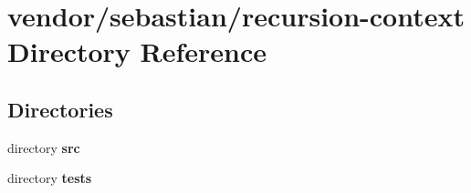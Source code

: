 \section{vendor/sebastian/recursion-\/context Directory Reference}
\label{dir_f7f3b1c5897be3d0d398f7fc457f0d7e}
\subsection*{Directories}
\begin{DoxyCompactItemize}
\item 
directory {\bf src}
\item 
directory {\bf tests}
\end{DoxyCompactItemize}
